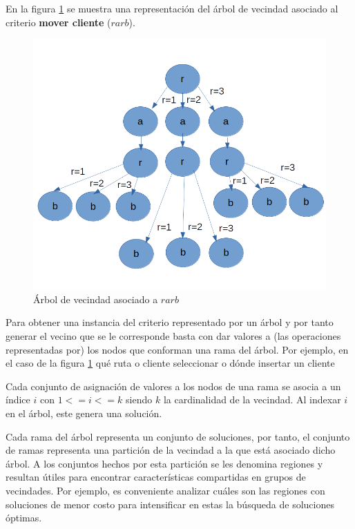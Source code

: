 En la figura \ref{fig:neigh-tree} se muestra una representación del árbol de vecindad asociado al criterio \textbf{mover cliente} ($rarb$).

\begin{figure}
	\centering
	\includegraphics[width=0.9\linewidth]{Graphics/Neigh-Tree}
	\caption{Árbol de vecindad asociado a $rarb$}
	\label{fig:neigh-tree}
\end{figure}

Para obtener una instancia del criterio representado por un árbol y por tanto generar el vecino que se le corresponde basta con dar valores a (las operaciones representadas por) los nodos que conforman una rama del árbol. Por ejemplo, en el caso de la figura \ref{fig:neigh-tree} qué ruta o cliente seleccionar o dónde insertar un cliente

Cada conjunto de asignación de valores a los nodos de una rama se asocia a un índice $i$ con $1<=i<=k$ siendo $k$ la cardinalidad de la vecindad. Al indexar $i$ en el árbol, este genera una solución.  

Cada rama del árbol representa un conjunto de soluciones, por tanto, el conjunto de ramas representa una partición de la vecindad a la que está asociado dicho árbol. A los conjuntos hechos por esta partición se les denomina regiones y resultan útiles para encontrar características compartidas en grupos de vecindades. Por ejemplo, es conveniente analizar cuáles son las regiones con soluciones de menor costo para intensificar en estas la búsqueda de soluciones óptimas.

